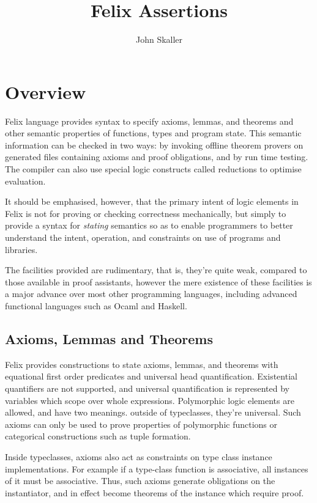 \documentclass{report}
\title{Felix Assertions}
\author{John Skaller}
\begin{document}
\maketitle
\tableofcontents

\chapter{Overview}
Felix language provides syntax to specify axioms, lemmas, and theorems
and other semantic properties of functions, types and program state. This semantic
information can be checked in two ways: by invoking offline theorem
provers on generated files containing axioms and proof obligations,
and by run time testing. The compiler can also use special logic
constructs called reductions to optimise evaluation.

It should be emphasised, however, that the primary intent of logic
elements in Felix is not for proving or checking correctness
mechanically, but simply to provide a syntax for {\em stating}
semantics so as to enable programmers to better understand
the intent, operation, and constraints on use of programs
and libraries.

The facilities provided are rudimentary, that is, they're
quite weak, compared to those available in proof assistants,
however the mere existence of these facilities is a major
advance over most other programming languages, including
advanced functional languages such as Ocaml and Haskell.

\section{Axioms, Lemmas and Theorems}
Felix provides constructions to state axioms, lemmas,
and theorems with equational first order predicates and universal
head quantification. Existential quantifiers are not
supported, and universal quantification is represented
by variables which scope over whole expressions.
Polymorphic logic elements are allowed, and have two meanings.
outside of typeclasses, they're universal. Such axioms can
only be used to prove properties of polymorphic functions
or categorical constructions such as tuple formation.

Inside typeclasses, axioms also act as constraints on 
type class instance implementations. For example if
a type-class function is associative, all instances
of it must be associative. Thus, such axioms generate
obligations on the instantiator, and in effect become
theorems of the instance which require proof.
\end{document}
